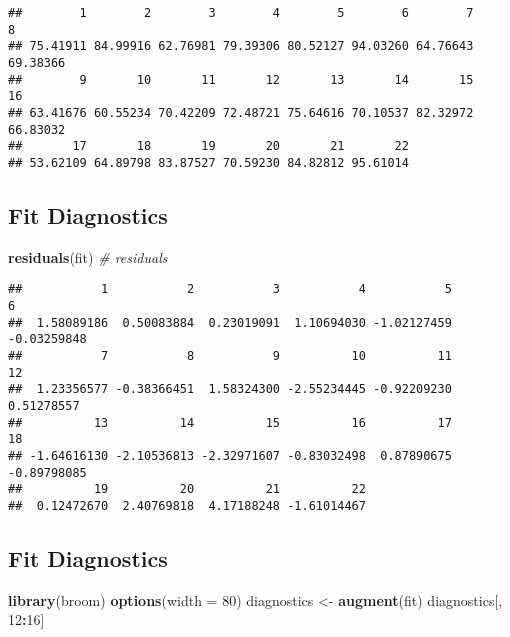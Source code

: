 \documentclass[]{article}
\newenvironment{Shaded}{\begin{snugshade}}{\end{snugshade}}
\newcommand{\KeywordTok}[1]{\textcolor[rgb]{0.13,0.29,0.53}{\textbf{#1}}}
\newcommand{\DataTypeTok}[1]{\textcolor[rgb]{0.13,0.29,0.53}{#1}}
\newcommand{\DecValTok}[1]{\textcolor[rgb]{0.00,0.00,0.81}{#1}}
\newcommand{\StringTok}[1]{\textcolor[rgb]{0.31,0.60,0.02}{#1}}
\newcommand{\CommentTok}[1]{\textcolor[rgb]{0.56,0.35,0.01}{\textit{#1}}}
\newcommand{\OperatorTok}[1]{\textcolor[rgb]{0.81,0.36,0.00}{\textbf{#1}}}
\newcommand{\NormalTok}[1]{#1}
\begin{document}
\begin{verbatim}
##        1        2        3        4        5        6        7        8 
## 75.41911 84.99916 62.76981 79.39306 80.52127 94.03260 64.76643 69.38366 
##        9       10       11       12       13       14       15       16 
## 63.41676 60.55234 70.42209 72.48721 75.64616 70.10537 82.32972 66.83032 
##       17       18       19       20       21       22 
## 53.62109 64.89798 83.87527 70.59230 84.82812 95.61014
\end{verbatim}

\subsection{Fit Diagnostics}\label{fit-diagnostics-1}

\begin{Shaded}
\begin{Highlighting}[]
\KeywordTok{residuals}\NormalTok{(fit) }\CommentTok{# residuals}
\end{Highlighting}
\end{Shaded}

\begin{verbatim}
##           1           2           3           4           5           6 
##  1.58089186  0.50083884  0.23019091  1.10694030 -1.02127459 -0.03259848 
##           7           8           9          10          11          12 
##  1.23356577 -0.38366451  1.58324300 -2.55234445 -0.92209230  0.51278557 
##          13          14          15          16          17          18 
## -1.64616130 -2.10536813 -2.32971607 -0.83032498  0.87890675 -0.89798085 
##          19          20          21          22 
##  0.12472670  2.40769818  4.17188248 -1.61014467
\end{verbatim}

\subsection{Fit Diagnostics}\label{fit-diagnostics-2}

\begin{Shaded}
\begin{Highlighting}[]
\KeywordTok{library}\NormalTok{(broom)}
\KeywordTok{options}\NormalTok{(}\DataTypeTok{width =} \DecValTok{80}\NormalTok{)}
\NormalTok{diagnostics <-}\StringTok{ }\KeywordTok{augment}\NormalTok{(fit)}
\NormalTok{diagnostics[, }\DecValTok{12}\OperatorTok{:}\DecValTok{16}\NormalTok{]}
\end{Highlighting}
\end{Shaded}
\end{document}
